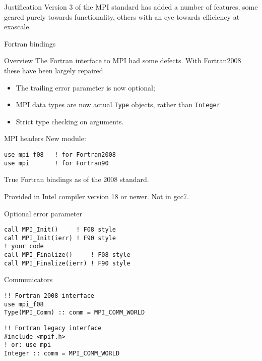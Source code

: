 \documentclass[11pt,headernav]{beamer}
\newcounter{tacc}
\begin{document}
\begin{frame}{Justification}
  Version 3 of the MPI standard has added a number
  of features, some geared purely towards functionality,
  others with an eye towards efficiency at exascale.
\end{frame}

 {Fortran bindings}

\lstset{language=Fortran}
\begin{numberedframe}{Overview}
  The Fortran interface to MPI had some defects.
  With Fortran2008 these have been largely repaired.
  \begin{itemize}
  \item The trailing error parameter is now optional;
  \item MPI data types are now actual \lstinline{Type} objects,
    rather than \lstinline{Integer}
  \item Strict type checking on arguments.
  \end{itemize}
\end{numberedframe}

\begin{numberedframe}{MPI headers}
\label{sl:mpi-header}
New module:
\begin{verbatim}
use mpi_f08   ! for Fortran2008
use mpi       ! for Fortran90
\end{verbatim}
True Fortran bindings as of the 2008 standard.
\begin{tacc}
Provided in Intel compiler version 18 or newer. Not in gcc7.
\end{tacc}
\end{numberedframe}

\begin{numberedframe}{Optional error parameter}
\lstset{language=Fortran}
\begin{lstlisting}
call MPI_Init()     ! F08 style
call MPI_Init(ierr) ! F90 style
! your code
call MPI_Finalize()     ! F08 style
call MPI_Finalize(ierr) ! F90 style
\end{lstlisting}
\end{numberedframe}

\begin{numberedframe}{Communicators}
\begin{lstlisting}
!! Fortran 2008 interface
use mpi_f08
Type(MPI_Comm) :: comm = MPI_COMM_WORLD
\end{lstlisting}
\begin{lstlisting}
!! Fortran legacy interface
#include <mpif.h>
! or: use mpi
Integer :: comm = MPI_COMM_WORLD
\end{lstlisting}
\end{numberedframe}
\end{document}
